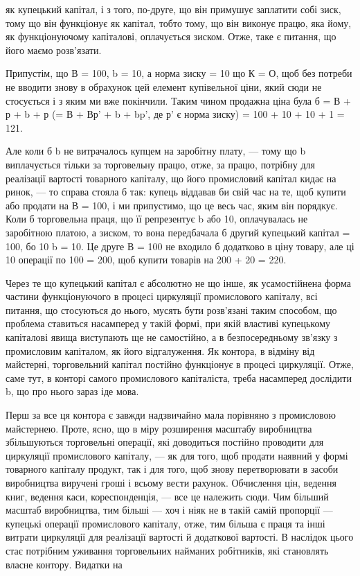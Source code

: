 як купецький капітал, і з того, по-друге, що він примушує заплатити
собі зиск, тому що він функціонує як капітал, тобто
тому, що він виконує працю, яка йому, як функціонуючому капіталові,
оплачується зиском. Отже, таке є питання, що його маємо
розв’язати.

Припустім, що В = 100, b = 10, а норма зиску = 10%
що К = О, щоб без потреби не вводити знову в обрахунок
цей елемент купівельної ціни, який сюди не стосується і з
яким ми вже покінчили. Таким чином продажна ціна була б =
В + р + b + р (= В + Вр' + b + bp', де р' є норма зиску) =
100 + 10 + 10 + 1 = 121.

Але коли б b не витрачалось купцем на заробітну плату, —
тому що b виплачується тільки за торговельну працю, отже, за
працю, потрібну для реалізації вартості товарного капіталу, що
його промисловий капітал кидає на ринок, — то справа стояла б
так: купець віддавав би свій час на те, щоб купити або продати
на В = 100, і ми припустимо, що це весь час, яким він порядкує.
Коли б торговельна праця, що її репрезентує b або 10,
оплачувалась не заробітною платою, а зиском, то вона передбачала
б другий купецький капітал = 100, бо 10%
b = 10. Це друге В = 100 не входило б додатково в ціну товару,
але ці 10%
операції по 100 = 200, щоб купити товарів на 200 + 20 = 220.

Через те що купецький капітал є абсолютно не що інше, як
усамостійнена форма частини функціонуючого в процесі циркуляції
промислового капіталу, всі питання, що стосуються до нього,
мусять бути розв’язані таким способом, що проблема ставиться
насамперед у такій формі, при якій властиві купецькому капіталові
явища виступають ще не самостійно, а в безпосередньому
зв’язку з промисловим капіталом, як його відгалуження. Як контора,
в відміну від майстерні, торговельний капітал постійно
функціонує в процесі циркуляції. Отже, саме тут, в конторі
самого промислового капіталіста, треба насамперед дослідити b,
що про нього зараз іде мова.

Перш за все ця контора є завжди надзвичайно мала порівняно
з промисловою майстернею. Проте, ясно, що в міру розширення
масштабу виробництва збільшуються торговельні операції,
які доводиться постійно проводити для циркуляції промислового
капіталу, — як для того, щоб продати наявний у формі
товарного капіталу продукт, так і для того, щоб знову перетворювати
в засоби виробництва виручені гроші і всьому вести рахунок.
Обчислення цін, ведення книг, ведення каси, кореспонденція,
— все це належить сюди. Чим більший масштаб виробництва,
тим більші — хоч і ніяк не в такій самій пропорції — купецькі операції
промислового капіталу, отже, тим більша є праця та інші
витрати циркуляції для реалізації вартості й додаткової вартості.
В наслідок цього стає потрібним уживання торговельних
найманих робітників, які становлять власне контору. Видатки на
